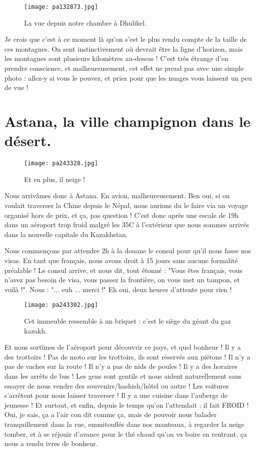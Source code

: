 \documentclass{book}
\begin{document}
\begin{figure}[h]
\centering
\texttt{[image: pa132873.jpg]}
\caption*{La vue depuis notre chambre à Dhulikel.}
\end{figure}

Je crois que c'est à ce moment là qu'on s'est le plus rendu compte de la taille de ces montagnes. On sent instinctivement où devrait être la ligne d'horizon, mais les montagnes sont plusieurs kilomètres au-dessus ! C'est très étrange d'en prendre conscience, et malheureusement, cet effet ne prend pas avec une simple photo : allez-y si vous le pouvez, et priez pour que les nuages vous laissent un peu de vue !


\chapter{Astana, la ville champignon dans le désert.}


\begin{wrapfigure}{l}{0.55\textwidth}
\centering
\texttt{[image: pa243328.jpg]}
\caption*{Et en plus, il neige !}
\end{wrapfigure}


Nous arrivâmes donc à Astana. En avion, malheureusement. Ben oui, si on voulait traverser la Chine depuis le Népal, nous aurions du le faire via un voyage organisé hors de prix, et ça, pas question ! C'est donc après une escale de 19h dans un aéroport trop froid malgré les 35\textdegree C à l'extérieur que nous sommes arrivés dans la nouvelle capitale du Kazakhstan.


Nous commençons par attendre 2h à la douane le consul pour qu'il nous fasse nos visas. En tant que français, nous avons droit à 15 jours sans aucune formalité préalable ! Le consul arrive, et nous dit, tout étonné : "Vous êtes français, vous n'avez pas besoin de visa, vous passez la frontière, on vous met un tampon, et voilà !". Nous : "... euh ... merci !"
Eh oui, deux heures d'attente pour rien !


\begin{figure}[h]
\centering
\texttt{[image: pa243302.jpg]}
\caption*{Cet immeuble ressemble à un briquet : c'est le siège du géant du gaz kazakh.}
\end{figure}

Et nous sortîmes de l'aéroport pour découvrir ce pays, et quel bonheur ! Il y a des trottoirs ! Pas de moto sur les trottoirs, ils sont réservés aux piétons ! Il n'y a pas de vaches sur la route ! Il n'y a pas de nids de poules ! Il y a des horaires dans les arrêts de bus ! Les gens sont gentils et nous aident naturellement sans essayer de nous vendre des souvenirs/hashish/hôtel ou autre ! Les voitures s'arrêtent pour nous laisser traverser ! Il y a une cuisine dans l'auberge de jeunesse ! Et surtout, et enfin, depuis le temps qu'on l'attendait : il fait FROID ! Oui, je sais, ça a l'air con dit comme ça, mais de pouvoir nous balader tranquillement dans la rue, emmitouflés dans nos manteaux, à regarder la neige tomber, et à se réjouir d'avance pour le thé chaud qu'on va boire en rentrant, ça nous a rendu ivres de bonheur.
\end{document}
